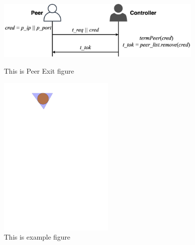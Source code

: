 \documentclass[11pt]{article}
\theoremstyle{plain}
\theoremstyle{definition}
\begin{document}
\begin{figure}
\centering

        \begin{minipage}[b]{0.45\textwidth}
            \includegraphics[width=0.9\textwidth]{Peer_Exit}
            \caption{This is Peer Exit figure}\label{fig:peer_exit}
        \end{minipage}
        \hfill
        \begin{minipage}[b]{0.45\textwidth}
            \includegraphics[width=0.5\textwidth]{example}
            \caption{This is example figure}\label{fig:example}
        \end{minipage}
\end{figure}


	

\end{document}
